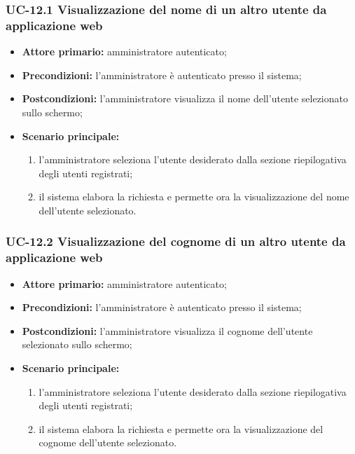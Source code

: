 \subsubsection{UC-12.1 Visualizzazione del nome di un altro utente da applicazione web}
\begin{itemize}
	\item \textbf{Attore primario:} amministratore autenticato;

	\item \textbf{Precondizioni:} l'amministratore è autenticato presso il sistema;

	\item \textbf{Postcondizioni:} l'amministratore visualizza il nome dell'utente selezionato sullo schermo;

	\item \textbf{Scenario principale:}
	\begin{enumerate}
   		 \item  l'amministratore seleziona l'utente desiderato dalla sezione riepilogativa degli utenti registrati;
    	 \item  il sistema elabora la richiesta e permette ora la visualizzazione del nome dell'utente selezionato.
	\end{enumerate}
\end{itemize}

\subsubsection{UC-12.2 Visualizzazione del cognome di un altro utente da applicazione web}
\begin{itemize}
	\item \textbf{Attore primario:} amministratore autenticato;

	\item \textbf{Precondizioni:} l'amministratore è autenticato presso il sistema;

	\item \textbf{Postcondizioni:} l'amministratore visualizza il cognome dell'utente selezionato sullo schermo;

	\item \textbf{Scenario principale:}
		\begin{enumerate}
   			 \item  l'amministratore seleziona l'utente desiderato dalla sezione riepilogativa degli utenti registrati;
    		 \item  il sistema elabora la richiesta e permette ora la visualizzazione del cognome dell'utente selezionato.
		\end{enumerate}
\end{itemize}

